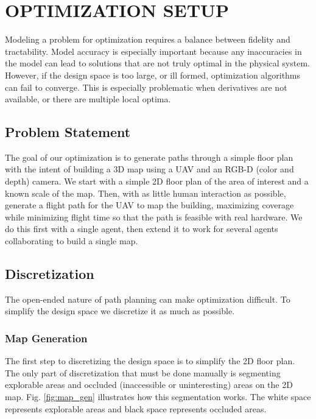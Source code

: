 \documentclass[letterpaper, 10 pt, conference]{ieeeconf}  %
\begin{document}
\section{OPTIMIZATION SETUP}\label{setup}

Modeling a problem for optimization requires a balance between fidelity and tractability. Model accuracy is especially important because any inaccuracies in the model can lead to solutions that are not truly optimal in the physical system. However, if the design space is too large, or ill formed, optimization algorithms can fail to converge. This is especially problematic when derivatives are not available, or there are multiple local optima.

\subsection{Problem Statement}


The goal of our optimization is to generate paths through a simple floor plan with the intent of building a 3D map using a UAV and an RGB-D (color and depth) camera. We start with a simple 2D floor plan of the area of interest and a known scale of the map. Then, with as little human interaction as possible, generate a flight path for the UAV to map the building, maximizing coverage while minimizing flight time so that the path is feasible with real hardware. We do this first with a single agent, then extend it to work for several agents collaborating to build a single map.

\subsection{Discretization}

The open-ended nature of path planning can make optimization difficult. To simplify the design space we discretize it as much as possible.

\subsubsection{Map Generation}

The first step to discretizing the design space is to simplify the 2D floor plan. The only part of discretization that must be done manually is segmenting explorable areas and occluded (inaccessible or uninteresting) areas on the 2D map. Fig. \ref{fig:map_gen} illustrates how this segmentation works. The white space represents explorable areas and black space represents occluded areas.
\end{document}
